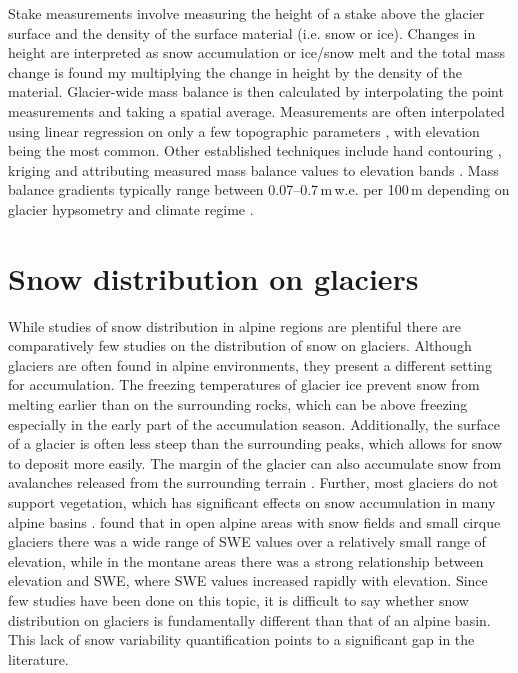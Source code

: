 \documentclass{sfuthesis}
\begin{document}
Stake measurements involve measuring the height of a stake above the glacier surface and the density of the surface material (i.e. snow or ice). Changes in height are interpreted as snow accumulation or ice/snow melt and the total mass change is found my multiplying the change in height by the density of the material. Glacier-wide mass balance is then calculated by interpolating the point measurements and taking a spatial average. Measurements are often interpolated using linear regression on only a few topographic parameters \citep[e.g.][]{MacDougall2011}, with elevation being the most common. Other established techniques include hand contouring \citep[e.g.][]{Tangborn1975}, kriging \citep[e.g.][]{Hock1999} and attributing measured mass balance values to elevation bands \citep[e.g.][]{Thibert2008}. Mass balance gradients typically range  between 0.07--0.7\,m\,w.e. per 100\,m depending on glacier hypsometry and climate regime \citep[e.g][]{Pelto1987,Oerlemans1989,Rasmussen2005}. 

\section{Snow distribution on glaciers}
While studies of snow distribution in alpine regions are plentiful \citep[and sources within]{Clark2011} there are comparatively few studies on the distribution of snow on glaciers. Although glaciers are often found in alpine environments, they present a different setting for accumulation. The freezing temperatures of glacier ice prevent snow from melting earlier than on the surrounding rocks, which can be above freezing especially in the early part of the accumulation season. Additionally, the surface of a glacier is often less steep than the surrounding peaks, which allows for snow to deposit more easily. The margin of the glacier can also accumulate snow from avalanches released from the surrounding terrain \citep{Bloschl1991, Mott2008}. Further, most glaciers do not support vegetation, which has significant effects on snow accumulation in many alpine basins \citep{Pomeroy1999}. \cite{Alford1985} found that in open alpine areas with snow fields and small cirque glaciers there was a wide range of SWE values over a relatively small range of elevation, while in the montane areas there was a strong relationship between elevation and SWE, where SWE values increased rapidly with elevation. Since few studies have been done on this topic, it is difficult to say whether snow distribution on glaciers is fundamentally different than that of an alpine basin. This lack of snow variability quantification points to a significant gap in the literature.
\end{document}
